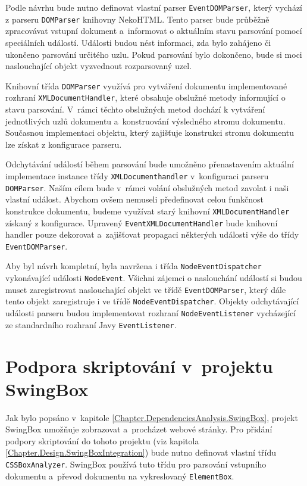 Podle návrhu bude nutno definovat vlastní parser \texttt{EventDOMParser}, který vychází z parseru \texttt{DOMParser} knihovny NekoHTML. Tento parser bude průběžně zpracovávat vstupní dokument a~informovat o aktuálním stavu parsování pomocí speciálních událostí. Události budou nést informaci, zda bylo zahájeno či ukončeno parsování určitého uzlu. Pokud parsování bylo dokončeno, bude si moci naslouchající objekt vyzvednout rozparsovaný uzel. 

Knihovní třída \texttt{DOMParser} využívá pro vytváření dokumentu implementované rozhraní \texttt{XMLDocumentHandler}, které obsahuje obslužné metody informující o stavu parsování. V~rámci těchto obslužných metod dochází k vytváření jednotlivých uzlů dokumentu a~konstruování výsledného stromu dokumentu. Současnou implementaci objektu, který zajišťuje konstrukci stromu dokumentu lze získat z konfigurace parseru.

Odchytávání událostí během parsování bude umožněno přenastavením aktuální implementace instance třídy \texttt{XMLDocumenthandler} v~konfiguraci parseru \texttt{DOMParser}. Naším cílem bude v~rámci volání obslužných metod zavolat i naši vlastní událost. Abychom ovšem nemuseli předefinovat celou funkčnost konstrukce dokumentu, budeme využívat starý knihovní \texttt{XMLDocumentHandler} získaný z konfigurace. Upravený \texttt{EventXMLDocumentHandler} bude knihovní handler pouze dekorovat a~zajišťovat propagaci některých události výše do třídy \texttt{EventDOMParser}. 

Aby byl návrh kompletní, byla navržena i třída \texttt{NodeEventDispatcher} vykonávající události \texttt{NodeEvent}. Všichni zájemci o naslouchání událostí si budou muset zaregistrovat naslouchající objekt ve třídě \texttt{EventDOMParser}, který dále tento objekt zaregistruje i ve třídě \texttt{NodeEventDispatcher}. Objekty odchytávající události parseru budou implementovat rozhraní \texttt{NodeEventListener} vycházející ze standardního rozhraní Javy \texttt{EventListener}.

\section{Podpora skriptování v~projektu SwingBox}
\label{Chapter.Design.ScriptsInSwingBox}

Jak bylo popsáno v~kapitole \ref{Chapter.DependenciesAnalysis.SwingBox}, projekt SwingBox umožňuje zobrazovat a~procházet webové stránky. Pro přidání podpory skriptování do tohoto projektu (viz kapitola \ref{Chapter.Design.SwingBoxIntegration}) bude nutno definovat vlastní třídu \texttt{CSSBoxAnalyzer}. SwingBox používá tuto třídu pro parsování vstupního dokumentu a~převod dokumentu na vykreslovaný \texttt{ElementBox}.   

